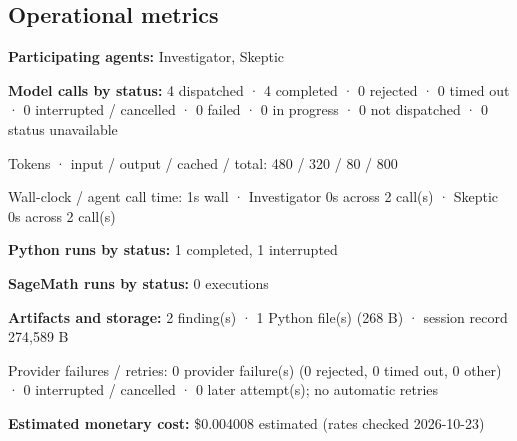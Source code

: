 \documentclass[11pt]{article}
\begin{document}
\subsection{Operational metrics}
\textbf{Participating agents:} Investigator, Skeptic\par
\textbf{Model calls by status:} 4 dispatched · 4 completed · 0 rejected · 0 timed out · 0 interrupted / cancelled · 0 failed · 0 in progress · 0 not dispatched · 0 status unavailable\par
Tokens · input / output / cached / total: 480 / 320 / 80 / 800\par
Wall-clock / agent call time: 1s wall · Investigator 0s across 2 call(s) · Skeptic 0s across 2 call(s)\par
\textbf{Python runs by status:} 1 completed, 1 interrupted\par
\textbf{SageMath runs by status:} 0 executions\par
\textbf{Artifacts and storage:} 2 finding(s) · 1 Python file(s) (268 B) · session record 274,589 B\par
Provider failures / retries: 0 provider failure(s) (0 rejected, 0 timed out, 0 other) · 0 interrupted / cancelled · 0 later attempt(s); no automatic retries\par
\textbf{Estimated monetary cost:} \$0.004008 estimated (rates checked 2026-10-23)\par
\end{document}
